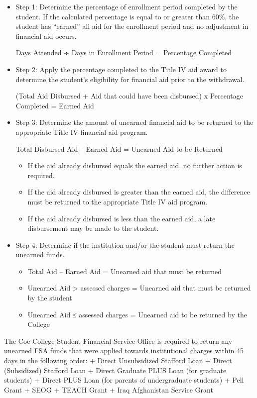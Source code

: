 \documentclass[
  letterpaper,
]{scrbook}
\providecommand{\tightlist}{%
  \setlength{\itemsep}{0pt}\setlength{\parskip}{0pt}}
\begin{document}
\begin{itemize}
\item
  Step 1: Determine the percentage of enrollment period completed by the
  student. If the calculated percentage is equal to or greater than
  60\%, the student has ``earned'' all aid for the enrollment period and
  no adjustment in financial aid occurs.

  Days Attended ÷ Days in Enrollment Period = Percentage Completed
\item
  Step 2: Apply the percentage completed to the Title IV aid award to
  determine the student's eligibility for financial aid prior to the
  withdrawal.

  (Total Aid Disbursed + Aid that could have been disbursed) x
  Percentage Completed = Earned Aid
\item
  Step 3: Determine the amount of unearned financial aid to be returned
  to the appropriate Title IV financial aid program.

  Total Disbursed Aid -- Earned Aid = Unearned Aid to be Returned

  \begin{itemize}
  \tightlist
  \item
    If the aid already disbursed equals the earned aid, no further
    action is required.
  \item
    If the aid already disbursed is greater than the earned aid, the
    difference must be returned to the appropriate Title IV aid program.
  \item
    If the aid already disbursed is less than the earned aid, a late
    disbursement may be made to the student.
  \end{itemize}
\item
  Step 4: Determine if the institution and/or the student must return
  the unearned funds.

  \begin{itemize}
  \tightlist
  \item
    Total Aid -- Earned Aid = Unearned aid that must be returned
  \item
    Unearned Aid \textgreater{} assessed charges = Unearned aid that
    must be returned by the student
  \item
    Unearned Aid ≤ assessed charges = Unearned aid to be returned by the
    College
  \end{itemize}
\end{itemize}

The Coe College Student Financial Service Office is required to return
any unearned FSA funds that were applied towards institutional charges
within 45 days in the following order: + Direct Unsubsidized Stafford
Loan + Direct (Subsidized) Stafford Loan + Direct Graduate PLUS Loan
(for graduate students) + Direct PLUS Loan (for parents of undergraduate
students) + Pell Grant + SEOG + TEACH Grant + Iraq Afghanistan Service
Grant
\end{document}
